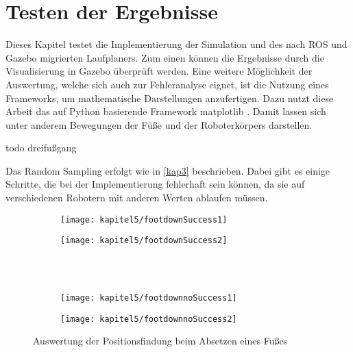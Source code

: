 \chapter{Testen der Ergebnisse}
\label{kap5}

Dieses Kapitel testet die Implementierung der Simulation und des nach \ac{ROS} und Gazebo migrierten Laufplaners. Zum einen können die Ergebnisse durch die Visualisierung in Gazebo überprüft werden. Eine weitere Möglichkeit der Auswertung, welche sich auch zur Fehleranalyse eignet, ist die Nutzung eines Frameworks, um mathematische Darstellungen anzufertigen. Dazu nutzt diese Arbeit das auf Python basierende Framework matplotlib \autocite{barrett2005matplotlib}. Damit lassen sich unter anderem Bewegungen der Füße und der Roboterkörpers darstellen.

todo dreifußgang

Das Random Sampling erfolgt wie in \autoref{kap3} beschrieben. Dabei gibt es einige Schritte, die bei der Implementierung fehlerhaft sein können, da sie auf verschiedenen Robotern mit anderen Werten ablaufen müssen. 

\begin{figure}[t!]
  \centering
  \begin{subfigure}[b]{.5\linewidth}
    \centering
    \texttt{[image: kapitel5/footdownSuccess1]}
    \label{kap5:footDownNormal1}
  \end{subfigure}%
  \begin{subfigure}[b]{.5\linewidth}
    \centering
    \texttt{[image: kapitel5/footdownSuccess2]}
    \label{kap5:footDownNormal2}
  \end{subfigure}\\
  \\[\smallskipamount]
  \begin{subfigure}[b]{.5\linewidth}
    \centering
    \texttt{[image: kapitel5/footdownnoSuccess1]}
    \label{kap5:footDownSpiral1}
  \end{subfigure}%
  \begin{subfigure}[b]{.5\linewidth}
    \centering
    \texttt{[image: kapitel5/footdownnoSuccess2]}
    \label{kap5:footDownSpiral2}
  \end{subfigure}%
  \caption{Auswertung der Positionsfindung beim Absetzen eines Fußes}
  \label{kap5:footDown}
\end{figure}

